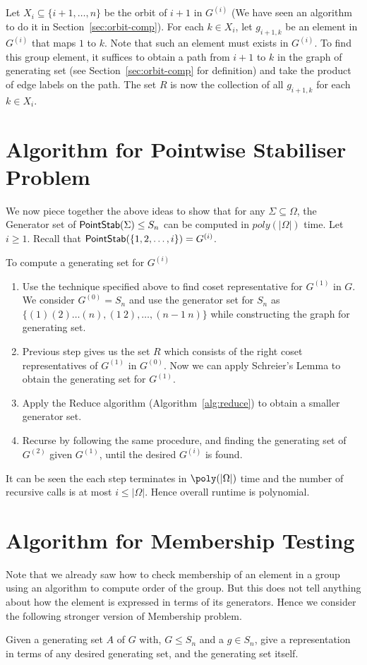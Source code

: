 Let $X_i \subseteq \{i+1, \ldots, n\}$ be the orbit of $i+1$ in $G^{(i)}$ (We
have seen an algorithm to do it in Section~\ref{sec:orbit-comp}). 
For each $k \in X_i$, let $g_{i+1, k}$ be an element in $G^{(i)}$ that maps
$1$ to $k$. Note that such an element must exists in $G^{(i)}$. To find this
group element, it suffices to obtain a path from $i+1$ to $k$ in the graph of
generating set (see Section~\ref{sec:orbit-comp} for definition) and take the
product of edge labels on the path. The set $R$ is now the collection of all
$g_{i+1,k}$ for each $k \in X_i$.

\section{Algorithm for Pointwise Stabiliser Problem}
We now piece together the above ideas to show that for any
$\Sigma\subseteq\Omega$, the Generator set of ${\sf PointStab}(\Sigma) \le S_n$ can
be computed in $poly(|\Omega|)$ time. Let $i \ge 1$. Recall that
${\sf PointStab}(\{1,2,\ldots,i\}) = G^{(i)}$. 

To compute a generating set for $G^{(i)}$
\begin{enumerate}
	\item Use the technique specified above to find coset representative for
		$G^{(1)}$ in $G$. We consider $G^{(0)} = S_n$ and use the
		generator set for $S_n$ as $\{ (1)(2)\ldots(n), (1~2), \ldots,
		(n-1~n)\}$ while constructing the graph for generating set.
	\item  Previous step gives us the set $R$ which consists of the right
		coset representatives of $G^{(1)}$ in $G^{(0)}$. Now we can
		apply Schreier's Lemma to obtain the generating set for
		$G^{(1)}$. 
	\item  Apply the {\sc Reduce} algorithm (Algorithm~\ref{alg:reduce})
		to obtain a smaller generator set.
	\item  Recurse by following the same procedure, and finding the
		generating set of $G^{(2)}$ given $G^{(1)}$, until the desired
		$G^{(i)}$ is found. 
\end{enumerate}
It can be seen the each step terminates in $\poly(|\Omega|)$ time and the
number of recursive calls is at most $i \le |\Omega|$. Hence overall runtime is
polynomial.


\section{Algorithm for Membership Testing}
Note that we already saw how to check membership of an element in a group
using an algorithm to compute order of the group. But this does not tell
anything about how the element is expressed in terms of its generators. Hence
we consider the following stronger version of Membership problem. 
\begin{problem}
Given a generating set $A$ of $G$ with, $G \leq S_n$ and a $g\in S_n$, give a
representation in terms of any desired generating set, and the generating set 
itself.
\end{problem} 

